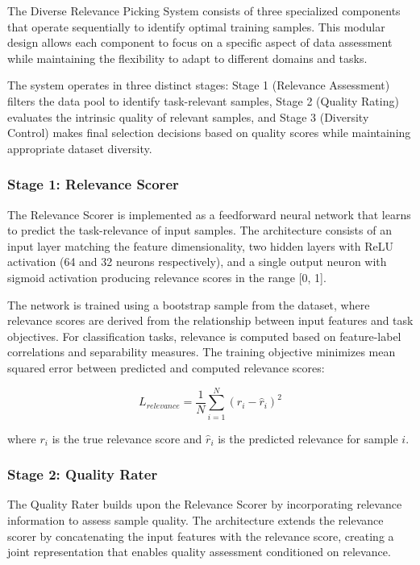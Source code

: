 \documentclass[12pt]{article}
\begin{document}
The Diverse Relevance Picking System consists of three specialized components that operate sequentially to identify optimal training samples. This modular design allows each component to focus on a specific aspect of data assessment while maintaining the flexibility to adapt to different domains and tasks.

The system operates in three distinct stages: Stage 1 (Relevance Assessment) filters the data pool to identify task-relevant samples, Stage 2 (Quality Rating) evaluates the intrinsic quality of relevant samples, and Stage 3 (Diversity Control) makes final selection decisions based on quality scores while maintaining appropriate dataset diversity.

\subsubsection{Stage 1: Relevance Scorer}\label{relevance-scorer}

The Relevance Scorer is implemented as a feedforward neural network that learns to predict the task-relevance of input samples. The architecture consists of an input layer matching the feature dimensionality, two hidden layers with ReLU activation (64 and 32 neurons respectively), and a single output neuron with sigmoid activation producing relevance scores in the range [0, 1].

The network is trained using a bootstrap sample from the dataset, where relevance scores are derived from the relationship between input features and task objectives. For classification tasks, relevance is computed based on feature-label correlations and separability measures. The training objective minimizes mean squared error between predicted and computed relevance scores:

\begin{equation}
L_{relevance} = \frac{1}{N} \sum_{i=1}^{N} (r_i - \hat{r}_i)^2
\end{equation}

where $r_i$ is the true relevance score and $\hat{r}_i$ is the predicted relevance for sample $i$.

\subsubsection{Stage 2: Quality Rater}\label{quality-rater}

The Quality Rater builds upon the Relevance Scorer by incorporating relevance information to assess sample quality. The architecture extends the relevance scorer by concatenating the input features with the relevance score, creating a joint representation that enables quality assessment conditioned on relevance.
\end{document}
